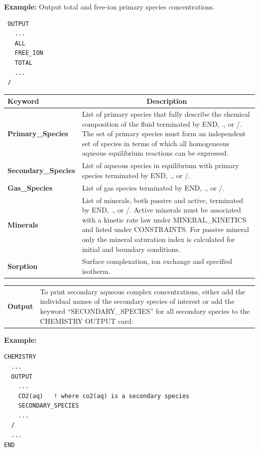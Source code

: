 \begin{mdframed}
\noindent
{\bf Example:} Output total and free-ion primary species concentrations.
\footnotesize
\begin{verbatim}
 OUTPUT
   ...
   ALL
   FREE_ION
   TOTAL
   ...
 /
\end{verbatim}
\normalsize
\end{mdframed}

\hfill\hyperlink{target_key}{\return}

\begin{center}
\begin{tabularx}{\linewidth}{lX}
\toprule
\bf Keyword & \multicolumn{1}{c}{\bf Description}\\
\midrule
\bf Primary\_Species & List of primary species that fully describe the chemical composition of the fluid terminated by END, ., or /. The set of primary species must form an independent set of species in terms of which all homogeneous aqueous equilibrium reactions can be expressed.\\
\midrule
\bf Secondary\_Species & List of aqueous species in equilibrium with primary species terminated by END, ., or /.\\
\midrule
\bf Gas\_Species & List of gas species terminated by END, ., or /.\\
\midrule
\bf Minerals & List of minerals, both passive and active, terminated by END, ., or /. Active minerals must be associated with a kinetic rate law under MINERAL\_KINETICS and listed under CONSTRAINTS. For passive mineral only the mineral saturation index is calculated for initial and boundary conditions.\\
\midrule
\bf Sorption & Surface complexation, ion exchange and specified isotherm.\\
\end{tabularx}

\end{center}

\begin{center}
\begin{tabularx}{\linewidth}{lX}
\midrule
\bf Output &
To print secondary aqueous complex concentrations, either add the individual names of the secondary species of interest or add the keyword ``SECONDARY\_SPECIES'' for all secondary species to the CHEMISTRY OUTPUT card:
\end{tabularx}
\end{center}

\begin{mdframed}
{\bf Example:}
\footnotesize
\begin{verbatim}
CHEMISTRY
  ...
  OUTPUT
    ...
    CO2(aq)   ! where co2(aq) is a secondary species
    SECONDARY_SPECIES
    ...
  /
  ...
END
\end{verbatim}
\normalsize
\end{mdframed}

